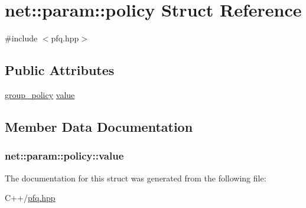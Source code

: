 \hypertarget{structnet_1_1param_1_1policy}{\section{net\-:\-:param\-:\-:policy Struct Reference}
\label{structnet_1_1param_1_1policy}
}


{\ttfamily \#include $<$pfq.\-hpp$>$}

\subsection*{Public Attributes}
\begin{DoxyCompactItemize}
\item 
\hyperlink{namespacenet_aedc1a0dde937ddbd0800af02920b1067}{group\-\_\-policy} \hyperlink{structnet_1_1param_1_1policy_abc94abaa3c703a34753cd42f435d03f6}{value}
\end{DoxyCompactItemize}


\subsection{Member Data Documentation}
\hypertarget{structnet_1_1param_1_1policy_abc94abaa3c703a34753cd42f435d03f6}{
\subsubsection[{value}]{ net\-::param\-::policy\-::value}}\label{structnet_1_1param_1_1policy_abc94abaa3c703a34753cd42f435d03f6}


The documentation for this struct was generated from the following file\-:\begin{DoxyCompactItemize}
\item 
C++/\hyperlink{pfq_8hpp}{pfq.\-hpp}\end{DoxyCompactItemize}
